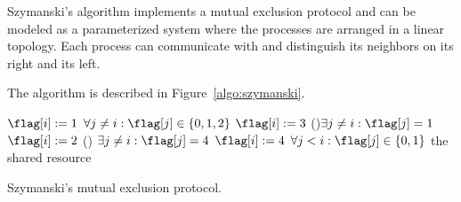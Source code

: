 Szymanski's algorithm %
implements a mutual
exclusion protocol and can be modeled as a parameterized system where
the processes are arranged in a linear topology. Each process can
communicate with and distinguish its neighbors on its right and its left.

The algorithm is described in Figure~\ref{algo:szymanski}.

\begin{algorithm}[ht]
  \dontprintsemicolon
  \SetAlgoNoLine
  $\flag[i] := 1$                                     
  \nl\Await $\forall j\neq i : \flag[j] \in \{0,1,2\}$ 
  \nl$\flag[i] := 3$                                       
  \nl\If (){$\exists j\neq i : \flag[j] = 1$ } 
  {$\flag[i] := 2$  }                     
  \nl\MyAwait ()
  {$\exists j\neq i : \flag[j] = 4$} {$\flag[i] := 4$ } 
  \nl\Await $\forall j < i : \flag[j] \in \{0,1\}$ 
  \nl the shared resource\\
  \nl{}   
  \caption{Szymanski's mutual exclusion protocol.}
  \label{algo:szymanski}
\end{algorithm}




